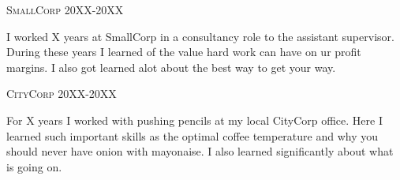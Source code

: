 





\begin{timeline}
	\item {\fontsize{11}{10}\textsc{SmallCorp}}
	\hfill 20XX-20XX

	{\small I worked X years at SmallCorp in a consultancy role to the assistant supervisor. During these years I learned of the value hard work can have on ur profit margins. I also got learned alot about the best way to get your way.}

	\item {\fontsize{11}{10}\textsc{CityCorp}}
	\hfill 20XX-20XX

	{\small For X years I worked with pushing pencils at my local CityCorp office. Here I learned such important skills as the optimal coffee temperature and why you should never have onion with mayonaise. I also learned significantly about what is going on.}

\end{timeline}
